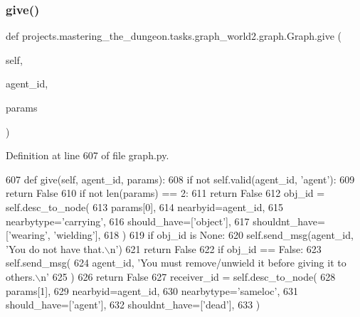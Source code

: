 \subsubsection{\texorpdfstring{give()}{give()}}
{\footnotesize\ttfamily def projects.\+mastering\+\_\+the\+\_\+dungeon.\+tasks.\+graph\+\_\+world2.\+graph.\+Graph.\+give (\begin{DoxyParamCaption}\item[{}]{self,  }\item[{}]{agent\+\_\+id,  }\item[{}]{params }\end{DoxyParamCaption})}



Definition at line 607 of file graph.\+py.


\begin{DoxyCode}
607     \textcolor{keyword}{def }give(self, agent\_id, params):
608         \textcolor{keywordflow}{if} \textcolor{keywordflow}{not} self.valid(agent\_id, \textcolor{stringliteral}{'agent'}):
609             \textcolor{keywordflow}{return} \textcolor{keyword}{False}
610         \textcolor{keywordflow}{if} \textcolor{keywordflow}{not} len(params) == 2:
611             \textcolor{keywordflow}{return} \textcolor{keyword}{False}
612         obj\_id = self.desc\_to\_node(
613             params[0],
614             nearbyid=agent\_id,
615             nearbytype=\textcolor{stringliteral}{'carrying'},
616             should\_have=[\textcolor{stringliteral}{'object'}],
617             shouldnt\_have=[\textcolor{stringliteral}{'wearing'}, \textcolor{stringliteral}{'wielding'}],
618         )
619         \textcolor{keywordflow}{if} obj\_id \textcolor{keywordflow}{is} \textcolor{keywordtype}{None}:
620             self.send\_msg(agent\_id, \textcolor{stringliteral}{'You do not have that.\(\backslash\)n'})
621             \textcolor{keywordflow}{return} \textcolor{keyword}{False}
622         \textcolor{keywordflow}{if} obj\_id == \textcolor{keyword}{False}:
623             self.send\_msg(
624                 agent\_id, \textcolor{stringliteral}{'You must remove/unwield it before giving it to others.\(\backslash\)n'}
625             )
626             \textcolor{keywordflow}{return} \textcolor{keyword}{False}
627         receiver\_id = self.desc\_to\_node(
628             params[1],
629             nearbyid=agent\_id,
630             nearbytype=\textcolor{stringliteral}{'sameloc'},
631             should\_have=[\textcolor{stringliteral}{'agent'}],
632             shouldnt\_have=[\textcolor{stringliteral}{'dead'}],
633         )

\end{DoxyCode}
